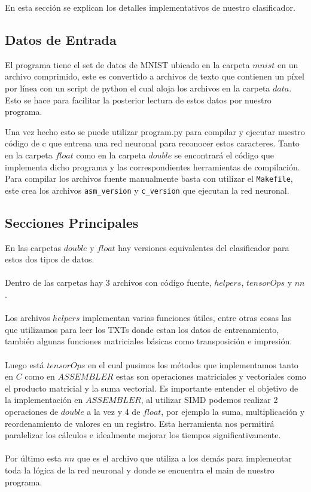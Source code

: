 
En esta sección se explican los detalles implementativos de nuestro clasificador.

\subsection{Datos de Entrada}

El programa tiene el set de datos de MNIST ubicado en la carpeta $mnist$ en un archivo comprimido, este es convertido a archivos de texto que contienen un píxel por línea con un script de python el cual aloja los archivos en la carpeta $data$. Esto se hace para facilitar la posterior lectura de estos datos por nuestro programa.

Una vez hecho esto se puede utilizar program.py para compilar y ejecutar nuestro código de c que entrena una red neuronal para reconocer estos caracteres. Tanto en la carpeta $float$ como en la carpeta $double$ se encontrará el código que implementa dicho programa y las correspondientes herramientas de compilación. Para compilar los archivos fuente manualmente basta con utilizar el \texttt{Makefile}, este crea los archivos \texttt{asm\_version} y \texttt{c\_version} que ejecutan la red neuronal.

\subsection{Secciones Principales}

En las carpetas $double$ y $float$ hay versiones equivalentes del clasificador para estos dos tipos de datos.
\\
\\
Dentro de las carpetas hay 3 archivos con código fuente, $helpers$, $tensorOps$ y $nn$.
\\
\\
Los archivos $helpers$ implementan varias funciones útiles, entre otras cosas las que utilizamos para leer los TXTs donde estan los datos de entrenamiento, también algunas funciones matriciales básicas como transposición e impresión.
\\
\\
Luego está $tensorOps$ en el cual pusimos los métodos que implementamos tanto en $C$ como en $ASSEMBLER$ estas son operaciones matriciales y vectoriales como el producto matricial y la suma vectorial. Es importante entender el objetivo de la implementación en $ASSEMBLER$, al utilizar SIMD podemos realizar 2 operaciones de $double$ a la vez y 4 de $float$, por ejemplo la suma, multiplicación y reordenamiento de valores en un registro. Esta herramienta nos permitirá paralelizar los cálculos e idealmente mejorar los tiempos significativamente.
\\
\\
Por último esta $nn$ que es el archivo que utiliza a los demás para implementar toda la lógica de la red neuronal y donde se encuentra el main de nuestro programa.

